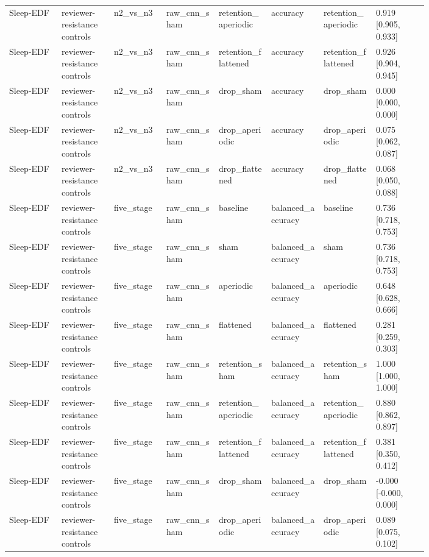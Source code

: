 \begin{longtable}{p{0.10\linewidth}p{0.10\linewidth}p{0.10\linewidth}p{0.10\linewidth}p{0.10\linewidth}p{0.10\linewidth}p{0.10\linewidth}p{0.10\linewidth}}
Sleep-EDF & reviewer-resistance controls & n2\_vs\_n3 & raw\_cnn\_sham & retention\_aperiodic & accuracy & retention\_aperiodic & 0.919 [0.905, 0.933]\\
Sleep-EDF & reviewer-resistance controls & n2\_vs\_n3 & raw\_cnn\_sham & retention\_flattened & accuracy & retention\_flattened & 0.926 [0.904, 0.945]\\
Sleep-EDF & reviewer-resistance controls & n2\_vs\_n3 & raw\_cnn\_sham & drop\_sham & accuracy & drop\_sham & 0.000 [0.000, 0.000]\\
Sleep-EDF & reviewer-resistance controls & n2\_vs\_n3 & raw\_cnn\_sham & drop\_aperiodic & accuracy & drop\_aperiodic & 0.075 [0.062, 0.087]\\
Sleep-EDF & reviewer-resistance controls & n2\_vs\_n3 & raw\_cnn\_sham & drop\_flattened & accuracy & drop\_flattened & 0.068 [0.050, 0.088]\\
Sleep-EDF & reviewer-resistance controls & five\_stage & raw\_cnn\_sham & baseline & balanced\_accuracy & baseline & 0.736 [0.718, 0.753]\\
Sleep-EDF & reviewer-resistance controls & five\_stage & raw\_cnn\_sham & sham & balanced\_accuracy & sham & 0.736 [0.718, 0.753]\\
Sleep-EDF & reviewer-resistance controls & five\_stage & raw\_cnn\_sham & aperiodic & balanced\_accuracy & aperiodic & 0.648 [0.628, 0.666]\\
Sleep-EDF & reviewer-resistance controls & five\_stage & raw\_cnn\_sham & flattened & balanced\_accuracy & flattened & 0.281 [0.259, 0.303]\\
Sleep-EDF & reviewer-resistance controls & five\_stage & raw\_cnn\_sham & retention\_sham & balanced\_accuracy & retention\_sham & 1.000 [1.000, 1.000]\\
Sleep-EDF & reviewer-resistance controls & five\_stage & raw\_cnn\_sham & retention\_aperiodic & balanced\_accuracy & retention\_aperiodic & 0.880 [0.862, 0.897]\\
Sleep-EDF & reviewer-resistance controls & five\_stage & raw\_cnn\_sham & retention\_flattened & balanced\_accuracy & retention\_flattened & 0.381 [0.350, 0.412]\\
Sleep-EDF & reviewer-resistance controls & five\_stage & raw\_cnn\_sham & drop\_sham & balanced\_accuracy & drop\_sham & -0.000 [-0.000, 0.000]\\
Sleep-EDF & reviewer-resistance controls & five\_stage & raw\_cnn\_sham & drop\_aperiodic & balanced\_accuracy & drop\_aperiodic & 0.089 [0.075, 0.102]\\

\end{longtable}
